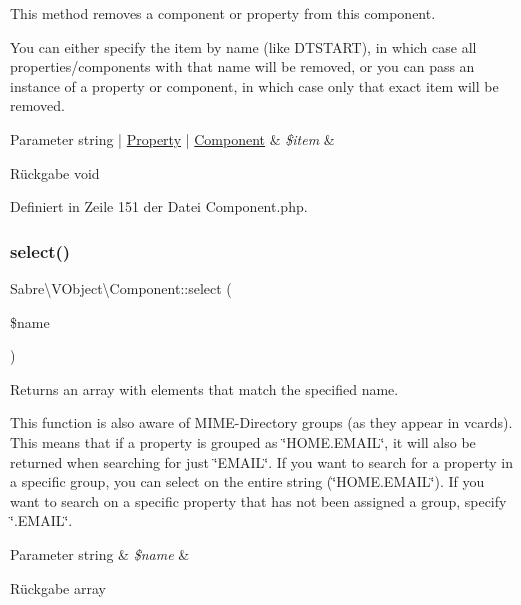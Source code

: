 This method removes a component or property from this component.

You can either specify the item by name (like D\+T\+S\+T\+A\+RT), in which case all properties/components with that name will be removed, or you can pass an instance of a property or component, in which case only that exact item will be removed.


\begin{DoxyParams}[1]{Parameter}
string | \mbox{\hyperlink{class_sabre_1_1_v_object_1_1_property}{Property}} | \mbox{\hyperlink{class_sabre_1_1_v_object_1_1_component}{Component}} & {\em \$item} & \\
\hline
\end{DoxyParams}
\begin{DoxyReturn}{Rückgabe}
void 
\end{DoxyReturn}


Definiert in Zeile 151 der Datei Component.\+php.

\mbox{\label{class_sabre_1_1_v_object_1_1_component_afc4ec11d63f46fbf72cbc2c6013efd93}} 
\subsubsection{\texorpdfstring{select()}{select()}}
{\footnotesize\ttfamily Sabre\textbackslash{}\+V\+Object\textbackslash{}\+Component\+::select (\begin{DoxyParamCaption}\item[{}]{\$name }\end{DoxyParamCaption})}

Returns an array with elements that match the specified name.

This function is also aware of M\+I\+M\+E-\/\+Directory groups (as they appear in vcards). This means that if a property is grouped as \char`\"{}\+H\+O\+M\+E.\+E\+M\+A\+I\+L\char`\"{}, it will also be returned when searching for just \char`\"{}\+E\+M\+A\+I\+L\char`\"{}. If you want to search for a property in a specific group, you can select on the entire string (\char`\"{}\+H\+O\+M\+E.\+E\+M\+A\+I\+L\char`\"{}). If you want to search on a specific property that has not been assigned a group, specify \char`\"{}.\+E\+M\+A\+I\+L\char`\"{}.


\begin{DoxyParams}[1]{Parameter}
string & {\em \$name} & \\
\hline
\end{DoxyParams}
\begin{DoxyReturn}{Rückgabe}
array 
\end{DoxyReturn}


